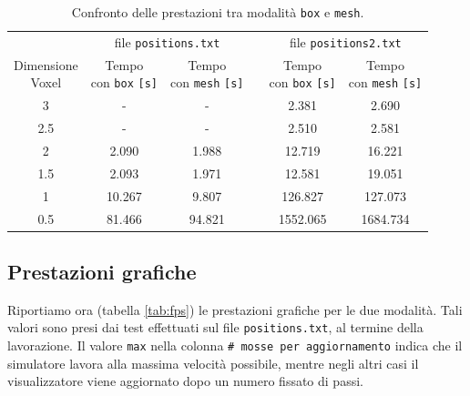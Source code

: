 \begin{center}
  \begin{table}[hb]
   \centering
      \begin{tabular}{cccccc}
        \toprule
        & \multicolumn{2}{c}{file \texttt{positions.txt}} & & \multicolumn{2}{c}{file \texttt{positions2.txt}}\\
        \cmidrule(r){2-3}\cmidrule(r){5-6}
          \shortstack{Dimensione\\ Voxel} & \shortstack{Tempo \\con \texttt{box} \texttt{[s]}} & \shortstack{Tempo \\con \texttt{mesh} \texttt{[s]}} & & \shortstack{Tempo \\con \texttt{box} \texttt{[s]}} & \shortstack{Tempo \\con \texttt{mesh} \texttt{[s]}}\\
        \midrule
          3   & -      & -      & & 2.381    & 2.690    \\
          2.5 & -      & -      & & 2.510    & 2.581    \\
          2   & 2.090  & 1.988  & & 12.719   & 16.221   \\
          1.5 & 2.093  & 1.971  & & 12.581   & 19.051   \\
          1   & 10.267 & 9.807  & & 126.827  & 127.073  \\
          0.5 & 81.466 & 94.821 & & 1552.065 & 1684.734 \\
        \bottomrule
      \end{tabular}
      \caption{Confronto delle prestazioni tra modalità \texttt{box} e \texttt{mesh}.}
      \label{tab:confrontoBoxMesh}
  \end{table}
\end{center}

\subsection{Prestazioni grafiche}
Riportiamo ora (tabella \ref{tab:fps}) le prestazioni grafiche per le due modalità. Tali valori sono presi dai test effettuati sul file \texttt{positions.txt}, al termine della lavorazione. Il valore \texttt{max} nella colonna \texttt{\# mosse per aggiornamento} indica che il simulatore lavora alla massima velocità possibile, mentre negli altri casi il visualizzatore viene aggiornato dopo un numero fissato di passi.

